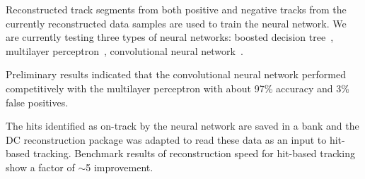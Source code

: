 
Reconstructed track segments from both positive and negative tracks from the currently reconstructed data
samples are used to train the neural network. We are currently testing three types of neural networks: boosted
decision tree~\cite{bdt}, multilayer perceptron~\cite{mp}, convolutional neural network~\cite{cnn}. 


Preliminary results indicated that the convolutional neural network performed competitively with the multilayer
perceptron with about 97\% accuracy and 3\% false positives. 

The hits identified as on-track by the neural network are saved in a bank and the DC reconstruction package was
adapted to read these data as an input to hit-based tracking. Benchmark results of reconstruction speed for
hit-based tracking show a factor of $\sim$5  improvement.


